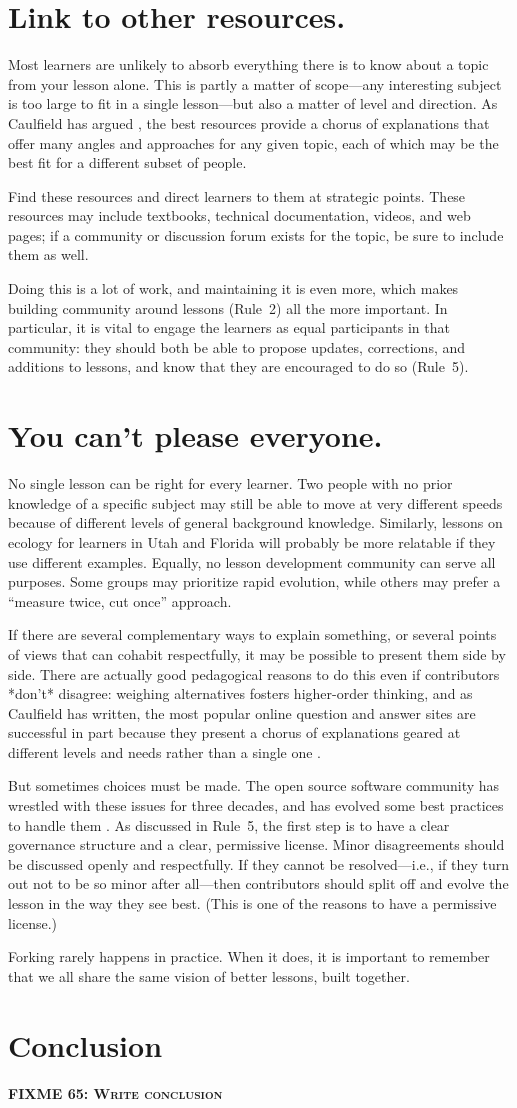 \documentclass[10pt,letterpaper]{article}
\newcommand{\fixme}[2]{\textsc{\textbf{FIXME {#1}: {#2}}}}
\newcommand{\rulemajor}[1]{\section{#1}}
\begin{document}
\rulemajor{Link to other resources.}

Most learners are unlikely to absorb everything there is to know about a topic
from your lesson alone.
This is partly a matter of scope---any interesting subject is too large
to fit in a single lesson---but also a matter of level and direction.
As Caulfield has argued \cite{choral-explanations},
the best resources provide a chorus of explanations
that offer many angles and approaches for any given topic,
each of which may be the best fit for a different subset of people.

Find these resources and direct learners to them at strategic points.
These resources may include textbooks,
technical documentation,
videos,
and web pages;
if a community or discussion forum exists for the topic,
be sure to include them as well.

Doing this is a lot of work,
and maintaining it is even more,
which makes building community around lessons (Rule~2) all the more important.
In particular,
it is vital to engage the learners as equal participants in that community:
they should both be able to propose updates, corrections, and additions to lessons,
and know that they are encouraged to do so (Rule~5).

\rulemajor{You can't please everyone.}

No single lesson can be right for every learner.
Two people with no prior knowledge of a specific subject
may still be able to move at very different speeds
because of different levels of general background knowledge.
Similarly,
lessons on ecology for learners in Utah and Florida
will probably be more relatable if they use different examples.
Equally,
no lesson development community can serve all purposes.
Some groups may prioritize rapid evolution,
while others may prefer a ``measure twice, cut once'' approach.

If there are several complementary ways to explain something,
or several points of views that can cohabit respectfully,
it may be possible to present them side by side.
There are actually good pedagogical reasons to do this even if contributors *don't* disagree:
weighing alternatives fosters higher-order thinking,
and as Caulfield has written,
the most popular online question and answer sites
are successful in part because they present a chorus of explanations
geared at different levels and needs
rather than a single one \cite{choral-explanations}.

But sometimes choices must be made.
The open source software community has wrestled with these issues for three decades,
and has evolved some best practices to handle them
\cite{producing-oss}.
As discussed in Rule~5,
the first step is to have a clear governance structure and a clear, permissive license.
Minor disagreements should be discussed openly and respectfully.
If they cannot be resolved---i.e., if they turn out not to be so minor after all---then
contributors should split off and evolve the lesson in the way they see best.
(This is one of the reasons to have a permissive license.)

Forking rarely happens in practice.
When it does,
it is important to remember that we all share the same vision of better lessons, built together.

\section*{Conclusion}

\fixme{65}{Write conclusion}


\end{document}
